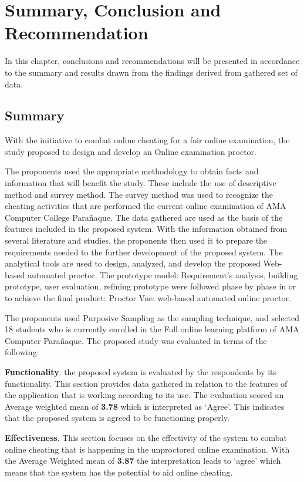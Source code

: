 \chapter{Summary, Conclusion and Recommendation}

In this chapter, conclusions and recommendations will be presented in accordance to the summary and results drawn from the findings derived from gathered set of data.

\section{Summary}

With the initiative to combat online cheating for a fair online examination, the study proposed to design and develop an Online examination proctor.

The proponents used the appropriate methodology to obtain facts and information that will benefit the study.
These include the use of descriptive method and survey method.
The survey method was used to recognize the cheating activities that are performed the current online examination of AMA Computer College Parañaque.
The data gathered are used as the basis of the features included in the proposed system.
With the information obtained from several literature and studies, the proponents then used it to prepare the requirements needed to the further development of the proposed system.
The analytical tools are used to design, analyzed, and develop the proposed Web-based automated proctor.
The prototype model: Requirement’s analysis, building prototype, user evaluation, refining prototype were followed phase by phase in or to achieve the final product: Proctor Vue: web-based automated online proctor.

The proponents used Purposive Sampling as the sampling technique, and selected 18 students who is currently enrolled in the Full online learning platform of AMA Computer Parañaque.
The proposed study was evaluated in terms of the following:

\textbf{Functionality}.
the proposed system is evaluated by the respondents by its functionality.
This section provides data gathered in relation to the features of the application that is working according to its use.
The evaluation scored an Average weighted mean of \textbf{3.78} which is interpreted as ‘Agree’.
This indicates that the proposed system is agreed to be functioning properly.

\textbf{Effectiveness}.
This section focuses on the effectivity of the system to combat online cheating that is happening in the unproctored online examination.
With the Average Weighted mean of \textbf{3.87} the interpretation leads to ‘agree’ which means that the system has the potential to aid online cheating.

